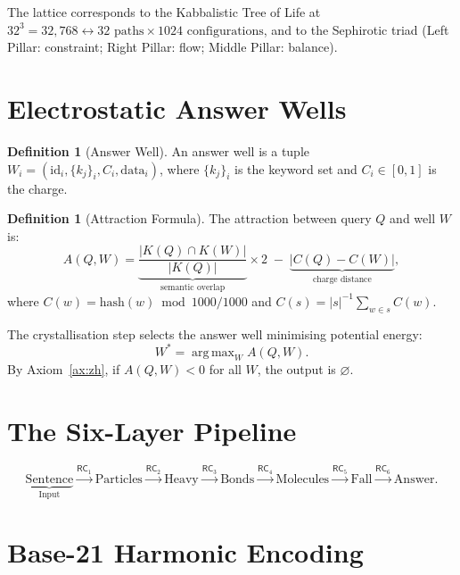 \documentclass[11pt,twoside]{article}
\theoremstyle{plain}
\theoremstyle{definition}
\newtheorem{definition}[theorem]{Definition}
\theoremstyle{remark}
\DeclareMathOperator*{\argmax}{arg\,max}
\newcommand{\RC}[1]{\textsf{RC}_{#1}}
\begin{document}
The lattice corresponds to the Kabbalistic Tree of Life at $32^3=32{,}768\leftrightarrow
32\text{ paths}\times 1024\text{ configurations}$, and to the Sephirotic
triad (Left Pillar: constraint; Right Pillar: flow; Middle Pillar: balance).

\section{Electrostatic Answer Wells}

\begin{definition}[Answer Well]
An answer well is a tuple $W_i = (\mathrm{id}_i, \{k_j\}_i, C_i, \mathrm{data}_i)$,
where $\{k_j\}_i$ is the keyword set and $C_i\in[0,1]$ is the charge.
\end{definition}

\begin{definition}[Attraction Formula]\label{def:attract}
The attraction between query $Q$ and well $W$ is:
\begin{equation}\label{eq:attract}
  A(Q,W) = \underbrace{\frac{|K(Q)\cap K(W)|}{|K(Q)|}}_{\text{semantic overlap}}
  \times 2 \;-\; \underbrace{|C(Q)-C(W)|}_{\text{charge distance}},
\end{equation}
where $C(w)=\mathrm{hash}(w)\bmod 1000/1000$ and
$C(s) = |s|^{-1}\sum_{w\in s}C(w)$.
\end{definition}

The crystallisation step selects the answer well minimising potential energy:
\begin{equation}
  W^* = \argmax_{W} A(Q,W).
\end{equation}
By Axiom~\ref{ax:zh}, if $A(Q,W)<0$ for all $W$, the output is $\varnothing$.

\section{The Six-Layer Pipeline}

\begin{equation}\label{eq:pipeline}
  \underbrace{\text{Sentence}}_{\text{Input}}
  \xrightarrow{\RC{1}} \text{Particles}
  \xrightarrow{\RC{2}} \text{Heavy}
  \xrightarrow{\RC{3}} \text{Bonds}
  \xrightarrow{\RC{4}} \text{Molecules}
  \xrightarrow{\RC{5}} \text{Fall}
  \xrightarrow{\RC{6}} \text{Answer}.
\end{equation}

\section{Base-21 Harmonic Encoding}
\end{document}
